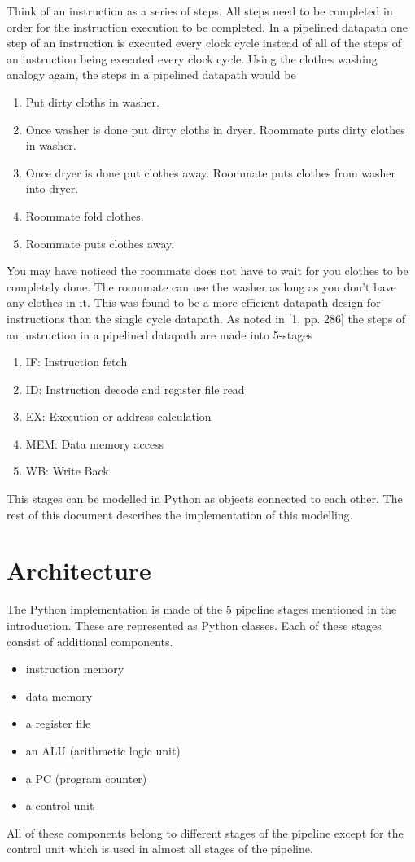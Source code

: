 \documentclass[conference]{IEEEtran}
\begin{document}
Think of an instruction as a series of steps.  All steps need to be completed in order for the instruction execution to be completed.  In a pipelined datapath one step of an instruction is executed every clock cycle instead of all of the steps of an instruction being executed every clock cycle.  Using the clothes washing analogy again, the steps in a pipelined datapath would be
\begin{enumerate}
    \item Put dirty cloths in washer.
    \item Once washer is done put dirty cloths in dryer.  Roommate puts dirty clothes in washer.
    \item Once dryer is done put clothes away.  Roommate puts clothes from washer into dryer.
    \item Roommate fold clothes.
    \item Roommate puts clothes away.
\end{enumerate}
You may have noticed the roommate does not have to wait for you clothes to be completely done.  The roommate can use the washer as long as you don't have any clothes in it.  This was found to be a more efficient datapath design for instructions than the single cycle datapath.
As noted in [1, pp. 286] the steps of an instruction in a pipelined datapath are made into 5-stages
\begin{enumerate}
\item IF: Instruction fetch
\item ID: Instruction decode and register file read
\item EX: Execution or address calculation
\item MEM: Data memory access
\item WB: Write Back
\end{enumerate}
This stages can be modelled in Python as objects connected to each other.  The rest of this document describes the implementation of this modelling.


\section{Architecture}

The Python implementation is made of the 5 pipeline stages mentioned in the introduction.  These are represented as Python classes.  Each of these stages consist of additional components.
\begin{itemize}
    \item instruction memory
    \item data memory
    \item a register file
    \item an ALU (arithmetic logic unit)
    \item a PC (program counter)
    \item a control unit
\end{itemize}
All of these components belong to different stages of the pipeline except for the control unit which is used in almost all stages of the pipeline.
\end{document}
